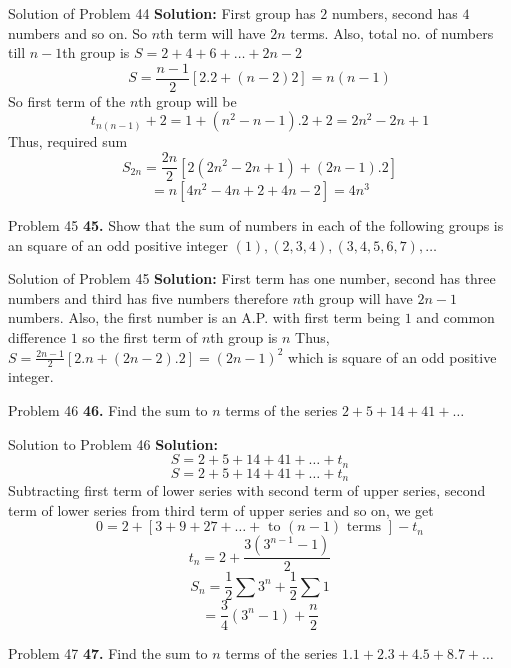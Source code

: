 \documentclass[aspectratio=1610,8pt]{beamer}
\begin{document}
\begin{frame}{Solution of Problem 44}
  \textbf{Solution:} First group has $2$ numbers, second has $4$ numbers and so on. So $n$th term will have $2n$ terms. Also, total
  no. of numbers till $n - 1$th group is $S =2 + 4 + 6 + \ldots + 2n - 2$
  $$S = \frac{n - 1}{2}[2.2 + (n - 2)2] = n(n - 1)$$
  So first term of the $n$th group will be
  $$t_{n(n - 1)} + 2 = 1 + (n^2 - n - 1).2 + 2 = 2n^2 - 2n + 1$$
  Thus, required sum $$S_{2n} = \frac{2n}{2}[2(2n^2 -2n + 1) + (2n - 1).2]$$
  $$= n[4n^2 -4n + 2 + 4n - 2] = 4n^3$$
\end{frame}
\begin{frame}{Problem 45}
  \textbf{45.} Show that the sum of numbers in each of the following groups is an square of an odd positive integer $(1), (2,3,4),
  (3,4,5,6,7), \ldots$
\end{frame}
\begin{frame}{Solution of Problem 45}
  \textbf{Solution:} First term has one number, second has three numbers and third has five numbers therefore $n$th group will have
  $2n - 1$ numbers.
  \vspace{5mm}\linebreak
  Also, the first number is an A.P. with first term being $1$ and common difference $1$ so the first term of $n$th group is $n$
  \vspace{5mm}\linebreak
  Thus, $S = \frac{2n - 1}{2}[2.n + (2n - 2).2] = (2n - 1)^2$
  \vspace{5mm}\linebreak
  which is square of an odd positive integer.
\end{frame}
\begin{frame}{Problem 46}
  \textbf{46.} Find the sum to $n$ terms of the series $2 + 5 + 14 + 41 + \ldots$
\end{frame}
\begin{frame}{Solution to Problem 46}
  \textbf{Solution:} $$S = 2 + 5 + 14 + 41 + \ldots + t_n$$
  $$S = 2 + 5 + 14 + 41 + \ldots + t_n$$
  Subtracting first term of lower series with second term of upper series, second term of lower series from third term of upper
  series and so on, we get
  $$0 = 2 + [3 + 9 + 27 + \ldots + \text{~to~}(n - 1)\text{~terms~}] - t_n$$
  $$t_n = 2 + \frac{3(3^{n - 1} - 1)}{2}$$
  $$S_n = \frac{1}{2}\sum 3^n + \frac{1}{2}\sum 1$$
  $$= \frac{3}{4}(3^n - 1) + \frac{n}{2}$$
\end{frame}
\begin{frame}{Problem 47}
  \textbf{47.} Find the sum to $n$ terms of the series $1.1 + 2.3 + 4.5 + 8.7 + \ldots$
\end{frame}
\end{document}
